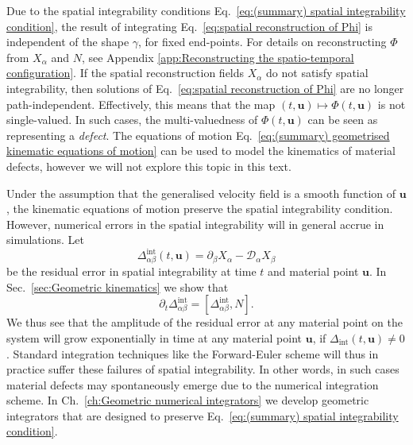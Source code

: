  Due to the spatial integrability conditions Eq.~\ref{eq:(summary) spatial integrability condition}, the result of integrating Eq.~\ref{eq:spatial reconstruction of Phi} is independent of the shape $\gamma$, for fixed end-points. For details on reconstructing $\Phi$ from $X_\alpha$ and $N$, see Appendix \ref{app:Reconstructing the spatio-temporal configuration}. If the spatial reconstruction fields $X_\alpha$ do not satisfy spatial integrability, then solutions of Eq.~\ref{eq:spatial reconstruction of Phi} are no longer path-independent. Effectively, this means that the map $(t, \mathbf{u}) \mapsto \Phi(t, \mathbf{u})$ is not single-valued. In such cases, the multi-valuedness of $\Phi(t, \mathbf{u})$ can be seen as representing a \textit{defect}. The equations of motion Eq.~\ref{eq:(summary) geometrised kinematic equations of motion} can be used to model the kinematics of material defects, however we will not explore this topic in this text.

Under the assumption that the generalised velocity field is a smooth function of $\mathbf{u}$, the kinematic equations of motion preserve the spatial integrability condition. However, numerical errors in the spatial integrability will in general accrue in simulations. Let
\begin{equation} \label{eq:spatial integrability residual}
	\Delta^\text{int}_{\alpha \beta}(t, \mathbf{u}) = \partial_\beta X_\alpha - \mathcal{D}_\alpha X_\beta
\end{equation}
be the residual error in spatial integrability at time $t$ and material point $\mathbf{u}$. In Sec.~\ref{sec:Geometric kinematics} we show that 
\begin{equation} \label{eq:(summary) time derivative of spatial integrability conditions}
\partial_t \Delta^\text{int}_{\alpha \beta} = [ \Delta^\text{int}_{\alpha \beta}, N].
\end{equation}
We thus see that the amplitude of the residual error at any material point on the system will grow exponentially in time at any material point $\mathbf{u}$, if $\Delta_\text{int}(t,\mathbf{u}) \neq 0$. Standard integration techniques like the Forward-Euler scheme will thus in practice suffer these failures of spatial integrability. In other words, in such cases material defects may spontaneously emerge due to the numerical integration scheme. In Ch.~\ref{ch:Geometric numerical integrators} we develop geometric integrators that are designed to preserve Eq.~\ref{eq:(summary) spatial integrability condition}. 

